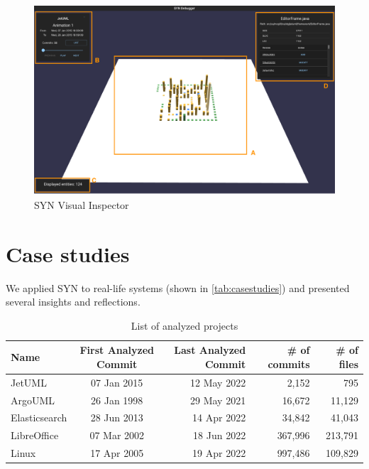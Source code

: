 \documentclass[11pt,twoside,english,singlespacing,headsepline,consistentlayout]{auxiliary/si-msc-thesis}
\begin{document}
\begin{figure}
    \center
    \includegraphics[width=\textwidth]{images/implementation/SYNUI-fileHistory.png}
    \caption{SYN Visual Inspector}
    \label{fig:SYNVisual}
\end{figure}

\section*{Case studies}
\graphicspath{ {images/casestudies} }





We applied SYN to real-life systems (shown in \autoref{tab:casestudies}) and presented several insights and reflections. 

\begin{table}[ht]
    \centering
    \begin{tabular}{lcrrr} 
        \hline
        {\bf Name} & {\bf First Analyzed Commit} & {\bf Last Analyzed Commit} & {\bf \# of commits} & {\bf \# of files}\\ 
        \hline
        JetUML & 07 Jan 2015 & 12 May 2022 & 2,152 & 795\\ 
        ArgoUML & 26 Jan 1998 & 29 May 2021 & 16,672 & 11,129 \\
        Elasticsearch & 28 Jun 2013 & 14 Apr 2022 & 34,842 & 41,043 \\
        LibreOffice & 07 Mar 2002 & 18 Jun 2022 & 367,996 & 213,791 \\
        Linux & 17 Apr 2005 & 19 Apr 2022 & 997,486 & 109,829
    \end{tabular}
    \caption{List of analyzed projects}
    \label{tab:casestudies}
\end{table}
\end{document}
